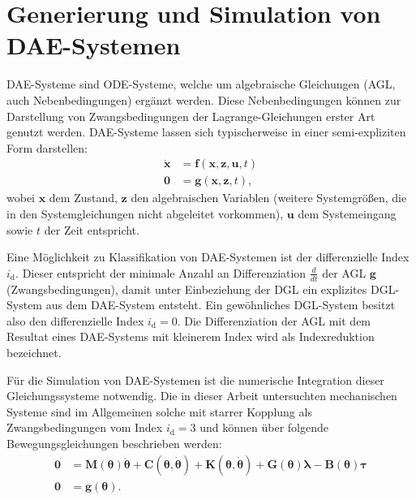 \section{Generierung und Simulation von DAE-Systemen}
DAE-Systeme sind ODE-Systeme, welche um algebraische Gleichungen (AGL, auch Nebenbedingungen) ergänzt werden. Diese Nebenbedingungen können zur Darstellung von Zwangsbedingungen der Lagrange-Gleichungen erster Art genutzt werden. DAE-Systeme lassen sich typischerweise in einer semi-expliziten Form darstellen:
	\begin{align}\label{eq:dae_std}
		\mathbf{\dot{x}} &= \mathbf{f}(\mathbf{x}, \mathbf{z}, \mathbf{u}, t) \\
		\mathbf{0} &= \mathbf{g}(\mathbf{x}, \mathbf{z}, t),
	\end{align}
wobei $\mathbf{x}$ dem Zustand, $\mathbf{z}$ den algebraischen Variablen (weitere Systemgrößen, die in den Systemgleichungen nicht abgeleitet vorkommen), $\mathbf{u}$ dem Systemeingang sowie $t$ der Zeit entspricht. \cite[S.137]{JanschekSystementwurf}

Eine Möglichkeit zu Klassifikation von DAE-Systemen ist der differenzielle Index $i_\mathrm{d}$. Dieser entspricht der minimale Anzahl an Differenziation $\frac{d}{dt}$ der AGL $\mathbf{g}$ (Zwangsbedingungen), damit unter Einbeziehung der DGL ein explizites DGL-System aus dem DAE-System entsteht. Ein gewöhnliches DGL-System besitzt also den differenzielle Index $i_\mathrm{d} = 0$. Die Differenziation der AGL mit dem Resultat eines DAE-Systems mit kleinerem Index wird als Indexreduktion bezeichnet. \cite[S.139]{JanschekSystementwurf}

Für die Simulation von DAE-Systemen ist die numerische Integration dieser Gleichungssysteme notwendig. Die in dieser Arbeit untersuchten mechanischen Systeme sind im Allgemeinen solche mit starrer Kopplung als Zwangsbedingungen vom Index $i_\mathrm{d} = 3$ und können über folgende Bewegungsgleichungen beschrieben werden:
\begin{align}
\mathbf{0} &= \mathbf{M}(\boldsymbol{\theta}) \ddot{\boldsymbol{\theta}} + \mathbf{C}(\boldsymbol{\theta}, \dot{\boldsymbol{\theta}}) + \mathbf{K}(\boldsymbol{\theta}, \dot{\boldsymbol{\theta}}) + \mathbf{G}(\boldsymbol{\theta}) \boldsymbol{\lambda} - \mathbf{B}(\boldsymbol{\theta}) \boldsymbol{\tau} \label{eq:implicit_mechanical_system}\\
\mathbf{0} &= \mathbf{g}(\boldsymbol{\theta}).
\end{align}
\cite[S.240]{JanschekSystementwurf}

